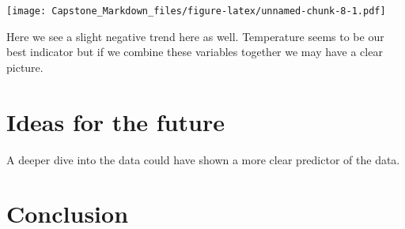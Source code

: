 \documentclass[]{article}
\newenvironment{Shaded}{\begin{snugshade}}{\end{snugshade}}
\newcommand{\KeywordTok}[1]{\textcolor[rgb]{0.13,0.29,0.53}{\textbf{#1}}}
\newcommand{\DataTypeTok}[1]{\textcolor[rgb]{0.13,0.29,0.53}{#1}}
\newcommand{\StringTok}[1]{\textcolor[rgb]{0.31,0.60,0.02}{#1}}
\newcommand{\CommentTok}[1]{\textcolor[rgb]{0.56,0.35,0.01}{\textit{#1}}}
\newcommand{\OperatorTok}[1]{\textcolor[rgb]{0.81,0.36,0.00}{\textbf{#1}}}
\newcommand{\NormalTok}[1]{#1}
\begin{document}
\begin{Shaded}
\end{Shaded}

\texttt{[image: Capstone\_Markdown\_files/figure-latex/unnamed-chunk-8-1.pdf]}

Here we see a slight negative trend here as well. Temperature seems to
be our best indicator but if we combine these variables together we may
have a clear picture.

\section{Ideas for the future}\label{ideas-for-the-future}

A deeper dive into the data could have shown a more clear predictor of
the data.

\section{Conclusion}\label{conclusion}
\end{document}
